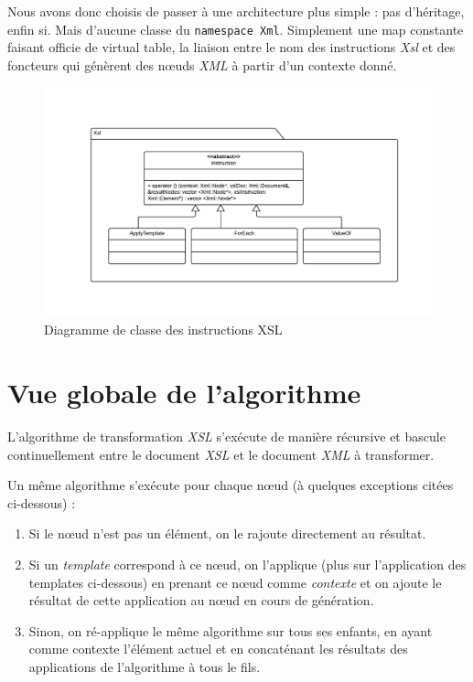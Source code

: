 Nous avons donc choisis de passer à une architecture plus simple : pas d'héritage, enfin si. Mais d'aucune classe du \lstinline$namespace Xml$.
Simplement une map constante faisant officie de virtual table, la liaison entre le nom des instructions \textit{Xsl} et des foncteurs qui
génèrent des nœuds \textit{XML} à partir d'un contexte donné.

\begin{landscape}
\begin{figure}[h!]
    \centering
    \includegraphics[width=\linewidth]{images/xsl-uml.pdf}
    \caption{Diagramme de classe des instructions XSL}
    \label{xslClassDiagram}
\end{figure}
\end{landscape}


\section{Vue globale de l'algorithme}

L'algorithme de transformation \textit{XSL} s’exécute de manière récursive et bascule continuellement entre le document \textit{XSL} et le
document \textit{XML} à transformer.

Un même algorithme s'exécute pour chaque nœud (à quelques exceptions citées ci-dessous) :

\begin{enumerate}
    \item Si le nœud n'est pas un élément, on le rajoute directement au résultat.
    \item Si un \textit{template} correspond à ce nœud, on l'applique (plus sur l'application des templates ci-dessous) en prenant ce nœud comme \textit{contexte} et on ajoute le résultat de cette application au nœud en cours de génération.
    \item Sinon, on ré-applique le même algorithme sur tous ses enfants, en ayant comme contexte l'élément actuel et en concaténant les résultats des applications de l'algorithme à tous le fils.
\end{enumerate}

